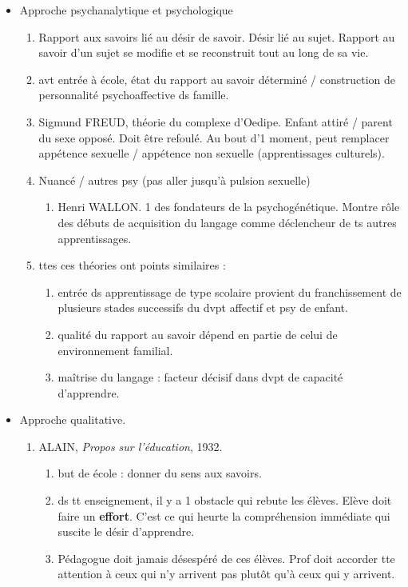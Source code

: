 \documentclass[12pt]{report}
\begin{document}
\begin{itemize}
\item Approche psychanalytique et psychologique
\begin{enumerate}
\item Rapport aux savoirs lié au désir de savoir. Désir lié au sujet. Rapport au savoir d'un sujet se modifie et se reconstruit tout au long de sa vie.\\
\item avt entrée à école, état du rapport au savoir déterminé / construction de personnalité psychoaffective ds famille.\\
\item Sigmund FREUD, théorie du complexe d'Oedipe. Enfant attiré / parent du sexe opposé. Doit être refoulé. Au bout d'1 moment, peut remplacer appétence sexuelle / appétence non sexuelle (apprentissages culturels). \\
\item Nuancé / autres psy (pas aller jusqu'à pulsion sexuelle)
\begin{enumerate}
\item Henri WALLON. 1 des fondateurs de la psychogénétique. Montre rôle des débuts de acquisition du langage comme déclencheur de ts autres apprentissages. \\
\end{enumerate}
\item ttes ces théories ont points similaires : 
\begin{enumerate}
\item entrée ds apprentissage de type scolaire provient du franchissement de plusieurs stades successifs du dvpt affectif et psy de enfant.\\
\item qualité du rapport au savoir dépend en partie de celui de environnement familial.\\
\item maîtrise du langage : facteur décisif dans dvpt de capacité d'apprendre.\\
\end{enumerate}
\end{enumerate}

\item Approche qualitative.
\begin{enumerate}
\item ALAIN, \textit{Propos sur l'éducation}, 1932. 
\begin{enumerate}
\item but de école : donner du sens aux savoirs.\\
\item ds tt enseignement, il y a 1 obstacle qui rebute les élèves. Elève doit faire un \textbf{effort}. C'est ce qui heurte la compréhension immédiate qui suscite le désir d'apprendre.
\item Pédagogue doit jamais désespéré de ces élèves. Prof doit accorder tte attention à ceux qui n'y arrivent pas plutôt qu'à ceux qui y arrivent. \\
\end{enumerate}
\end{enumerate}


\end{itemize}
\end{document}
